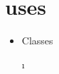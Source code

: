 \documentclass{report}
\begin{document}
\section{uses}
\begin{itemize}
\item \begin{ttfamily}Classes\end{ttfamily}\i
\end{itemize}
\end{document}
